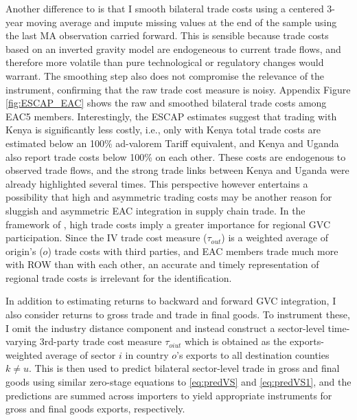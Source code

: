\documentclass[a4paper]{article}
\begin{document}
Another difference to \citet{Kummritz20161} is that I smooth bilateral trade costs using a centered 3-year moving average and impute missing values at the end of the sample using the last MA observation carried forward. This is sensible because trade costs based on an inverted gravity model are endogeneous to current trade flows, and therefore more volatile than pure technological or regulatory changes would warrant. The smoothing step also does not compromise the relevance of the instrument, confirming that the raw trade cost measure is noisy. Appendix Figure \ref{fig:ESCAP_EAC} shows the raw and smoothed bilateral trade costs among EAC5 members. Interestingly, the   ESCAP estimates suggest that trading with Kenya is significantly less costly, i.e., only with Kenya total trade costs are estimated below an 100\% ad-valorem Tariff equivalent, and Kenya and Uganda also report trade costs below 100\% on each other. These costs are endogenous to observed trade flows, and the strong trade links between Kenya and Uganda were already highlighted several times. This perspective however entertains a possibility that high and asymmetric trading costs may be another reason for sluggish and asymmetric EAC integration in supply chain trade. In the framework of \citet{antras2020geography}, high trade costs imply a greater importance for regional GVC participation. %
Since the IV trade cost measure ($\tau_{out}$) is a weighted average of origin's ($o$) trade costs with third parties, and EAC members trade much more with ROW than with each other, an accurate and timely representation of regional trade costs is irrelevant for the identification. \newline

In addition to estimating returns to backward and forward GVC integration, I also consider returns to gross trade and trade in final goods. To instrument these, I omit the industry distance component and instead construct a sector-level time-varying 3rd-party trade cost measure $\tau_{oiut}$ which is obtained as the exports-weighted average of sector $i$ in country $o$'s exports to all destination counties $k \neq u$. This is then used to predict bilateral sector-level trade in gross and final goods using similar zero-stage equations to \ref{eq:predVS} and \ref{eq:predVS1}, and the predictions are summed across importers to yield appropriate instruments for gross and final goods exports, respectively. \newline 
\end{document}
